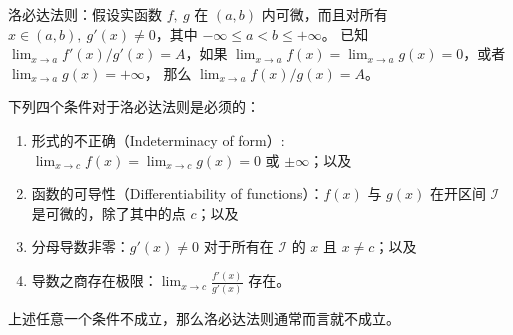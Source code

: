 \documentclass[../poma-notes.tex]{subfiles}
\begin{document}
\begin{anote}
  洛必达法则：假设实函数 $f,\ g$ 在 $(a, b)$ 内可微，而且对所有 $x \in (a,b),\ g'(x) \ne 0$，其中 $-\infty\le a<b \le+\infty$。
  已知 $\lim_{x\to a}f'(x)/g'(x)=A$，如果 $\lim_{x\to a}f(x)=\lim_{x\to a} g(x) = 0$，或者 $\lim_{x\to a}g(x)=+\infty$，
  那么 $\lim_{x\to a} f(x)/g(x) = A$。

  下列四个条件对于洛必达法则是必须的：
  \begin{enumerate}
    \item 形式的不正确（Indeterminacy of form）: $\lim_{x\to c} f(x) = \lim_{x\to c} g(x) = 0$ 或 $\pm\infty$；以及
    \item 函数的可导性（Differentiability of functions）：$f(x)$ 与 $g(x)$ 在开区间 $\mathcal{I}$ 是可微的，除了其中的点 $c$；以及
    \item 分母导数非零：$g'(x) \ne 0$ 对于所有在 $\mathcal{I}$ 的 $x$ 且 $x \ne c$；以及
    \item 导数之商存在极限：$\lim_{x\to c} \frac{f'(x)}{g'(x)}$ 存在。
  \end{enumerate}

  上述任意一个条件不成立，那么洛必达法则通常而言就不成立。
\end{anote}
\end{document}
